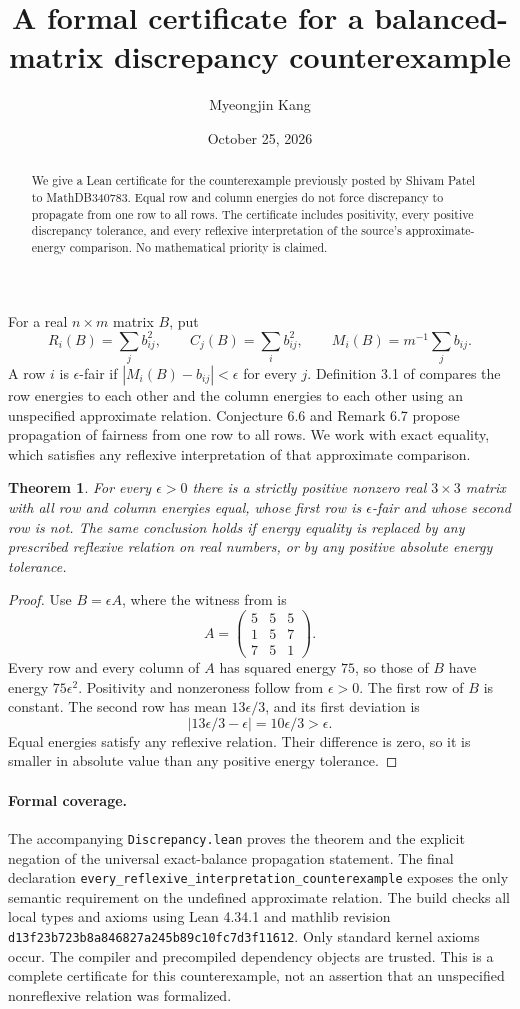 \documentclass[11pt]{article}
\title{A formal certificate for a balanced-matrix discrepancy counterexample}
\author{Myeongjin Kang}
\date{October 25, 2026}
\newtheorem{theorem}{Theorem}
\begin{document}
\maketitle
\begin{abstract}
We give a Lean certificate for the counterexample previously posted by Shivam
Patel to MathDB340783. Equal row and column energies do not force discrepancy
to propagate from one row to all rows. The certificate includes positivity,
every positive discrepancy tolerance, and every reflexive interpretation of
the source's approximate-energy comparison. No mathematical priority is claimed.
\end{abstract}
For a real $n\times m$ matrix $B$, put
\[
 R_i(B)=\sum_j b_{ij}^2,\qquad C_j(B)=\sum_i b_{ij}^2,
 \qquad M_i(B)=m^{-1}\sum_j b_{ij}.
\]
A row $i$ is $\epsilon$-fair if $|M_i(B)-b_{ij}|<\epsilon$ for every $j$.
Definition 3.1 of \cite{agama} compares the row energies to each other and
the column energies to each other using an unspecified approximate relation.
Conjecture 6.6 and Remark 6.7 propose propagation of fairness from one row
to all rows. We work with exact equality, which satisfies any reflexive
interpretation of that approximate comparison.
\begin{theorem}
For every $\epsilon>0$ there is a strictly positive nonzero real $3\times3$
matrix with all row and column energies equal, whose first row is
$\epsilon$-fair and whose second row is not. The same conclusion holds if
energy equality is replaced by any prescribed reflexive relation on real
numbers, or by any positive absolute energy tolerance.
\end{theorem}
\begin{proof}
Use $B=\epsilon A$, where the witness from \cite{patel} is
\[
A=\begin{pmatrix}5&5&5\\1&5&7\\7&5&1\end{pmatrix}.
\]
Every row and every column of $A$ has squared energy $75$, so those of
$B$ have energy $75\epsilon^2$. Positivity and nonzeroness follow from
$\epsilon>0$. The first row of $B$ is constant. The second row has mean
$13\epsilon/3$, and its first deviation is
\[
 |13\epsilon/3-\epsilon|=10\epsilon/3>\epsilon.
\]
Equal energies satisfy any reflexive relation. Their difference is zero,
so it is smaller in absolute value than any positive energy tolerance.
\end{proof}
\paragraph{Formal coverage.}
The accompanying \texttt{Discrepancy.lean} proves the theorem and the
explicit negation of the universal exact-balance propagation statement.
The final declaration \texttt{every\_reflexive\_interpretation\_counterexample}
exposes the only semantic requirement on the undefined approximate relation.
The build checks all local types and axioms using Lean 4.34.1 and mathlib
revision \texttt{d13f23b723b8a846827a245b89c10fc7d3f11612}.
Only standard kernel axioms occur. The compiler and precompiled dependency
objects are trusted. This is a complete certificate for this counterexample,
not an assertion that an unspecified nonreflexive relation was formalized.
\end{document}
